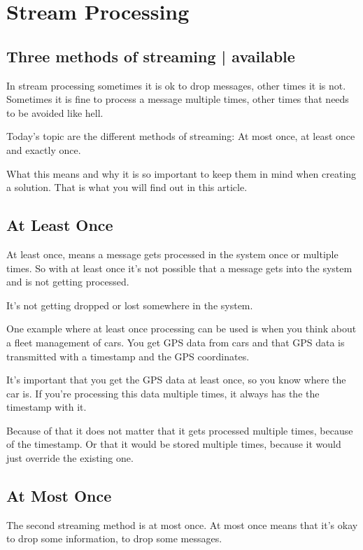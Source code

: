 \documentclass[12pt, numbers=noenddot]{scrreprt} %
\begin{document}
\section{Stream Processing}
\subsection{Three methods of streaming | available}

In stream processing sometimes it is ok to drop messages, other times it is not. Sometimes it is fine to process a message multiple times, other times that needs to be avoided like hell.

Today’s topic are the different methods of streaming: At most once, at least once and exactly once.

What this means and why it is so important to keep them in mind when creating a solution. That is what you will find out in this article.

\subsection{At Least Once}

At least once, means a message gets processed in the system once or multiple times. So with at least once it’s not possible that a message gets into the system and is not getting processed.

It’s not getting dropped or lost somewhere in the system.

One example where at least once processing can be used is when you think about a fleet management of cars. You get GPS data from cars and that GPS data is transmitted with a timestamp and the GPS coordinates.

It’s important that you get the GPS data at least once, so you know where the car is. If you’re processing this data multiple times, it always has the the timestamp with it.

Because of that it does not matter that it gets processed multiple times, because of the timestamp. Or that it would be stored multiple times, because it would just override the existing one.

\subsection{At Most Once}

The second streaming method is at most once. At most once means that it’s okay to drop some information, to drop some messages.
\end{document}
